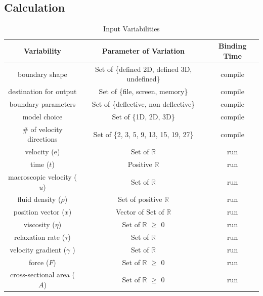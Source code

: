 \documentclass[12pt]{article}
\begin{document}
~\newpage

\subsection{Calculation} \label{sec_Calculation}

\begin{table}[!h]
\begin{center}
\begin{tabular}{| c | c | c |}
\hline
\textbf{Variability} & \textbf{Parameter of Variation} & \textbf{Binding Time}\\
\hline
boundary shape & Set of \{defined 2D, defined 3D, undefined\} & compile \\
\hline
destination for output & Set of \{file, screen, memory\} & compile \\
\hline
boundary parameters & Set of \{deflective, non deflective\} & compile \\
\hline
model choice & Set of \{1D, 2D, 3D\} & compile \\
\hline
\# of velocity directions & Set of \{2, 3, 5, 9,  13, 15, 19, 27\} & compile \\
\hline
velocity ($\mathrm{e}$) & Set of $\mathbb{R}$ & run \\
\hline
time ($t$) & Positive $\mathbb{R}$ & run \\
\hline
macroscopic velocity ($u$) & Set of $\mathbb{R}$ & run \\
\hline
fluid density ($\rho$) & Set of positive $\mathbb{R}$ & run \\
\hline
position vector ($x$) & Vector of Set of $\mathbb{R}$ & run \\
\hline
viscosity ($\eta$) & Set of $\mathbb{R}$ $\geq$ 0 & run \\
\hline
relaxation rate ($\tau$) & Set of $\mathbb{R}$ & run \\
\hline
velocity gradient ($\gamma$ )& Set of $\mathbb{R}$ & run\\
\hline
force ($F$) & Set of $\mathbb{R}$ $\geq$ 0 & run \\
\hline
cross-sectional area ($A$) & Set of $\mathbb{R}$ $\geq$ 0 & run \\
\hline
\end{tabular}
\caption{Input Variabilities}
\label{table:inputVar}
\end{center}
\end{table}

\end{document}
